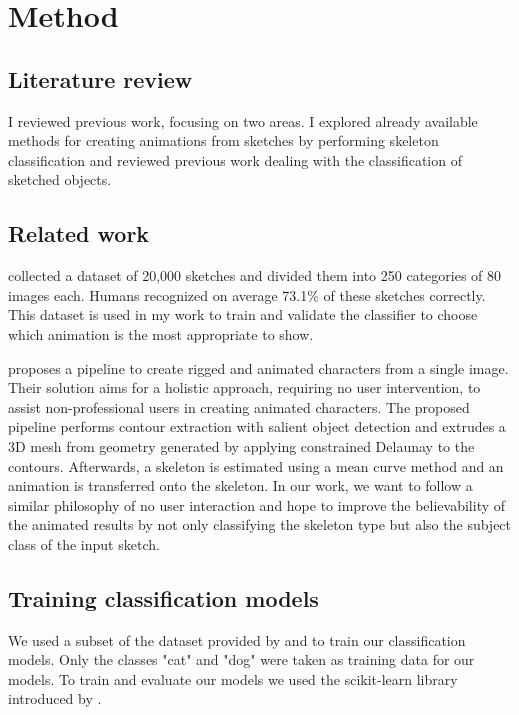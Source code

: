 \chapter{Method}
\label{ch:method}

\section*{Literature review}
I reviewed previous work, focusing on two areas. I explored already available
methods for creating animations from sketches by performing skeleton
classification and reviewed previous work dealing with the classification of
sketched objects.

\section*{Related work}
\textcite{eitz2012hdhso} collected a dataset of 20,000 sketches and divided them
into 250 categories of 80 images each. Humans recognized on average 73.1\% of 
these sketches correctly. This dataset is used in my work to train and validate
the classifier to choose which animation is the most appropriate to show.

\textcite{10.1145/3469877.3490565} proposes a pipeline to create rigged and
animated characters from a single image. Their solution aims for a holistic
approach, requiring no user intervention, to assist non-professional users in
creating animated characters. The proposed pipeline performs contour extraction
with salient object detection and extrudes a 3D mesh from geometry generated by
applying constrained Delaunay to the contours. Afterwards, a skeleton is
estimated using a mean curve method and an animation is transferred onto the
skeleton. In our work, we want to follow a similar philosophy of no user
interaction and hope to improve the believability of the animated results by not
only classifying the skeleton type but also the subject class of the input
sketch.

\section*{Training classification models}
We used a subset of the dataset provided by \textcite{eitz2012hdhso} and
\textcite{10.1145/2897824.2925954} to train our classification models.
Only the classes "cat" and "dog" were taken as training data for our models. 
To train and evaluate our models we used the scikit-learn library introduced by
\textcite{scikit-learn}.

